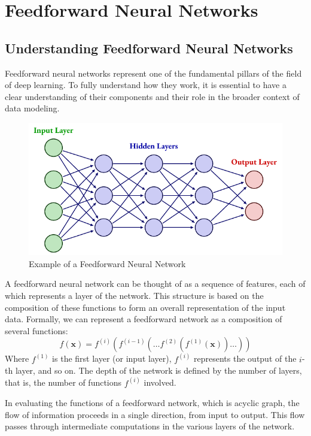 \section{Feedforward Neural Networks}

\subsection{Understanding Feedforward Neural Networks}

Feedforward neural networks represent one of the fundamental pillars of the field of deep learning. To fully understand how they work, it is essential to have a clear understanding of their components and their role in the broader context of data modeling.

\begin{figure}[!htbp]
    \centering
    \includegraphics[scale=1.4]{tikz/chapter1 - Feedforward Neural Network.pdf}
    \caption{Example of a Feedforward Neural Network}
\end{figure}

A feedforward neural network can be thought of as a sequence of features, each of which represents a layer of the network. This structure is based on the composition of these functions to form an overall representation of the input data. Formally, we can represent a feedforward network as a composition of several functions:
$$ f(\mathbf{x}) = f^{(i)}(f^{(i-1)}(\dots f^{(2)}(f^{(1)}(\mathbf{x})) \dots )) $$  
Where \( f^{(1)} \) is the first layer (or input layer), \( f^{(i)} \) represents the output of the \(i\)-th layer, and so on. The depth of the network is defined by the number of layers, that is, the number of functions \( f^{(i)} \) involved.

In evaluating the functions of a feedforward network, which is acyclic graph, the flow of information proceeds in a single direction, from input to output. This flow passes through intermediate computations in the various layers of the network. 

